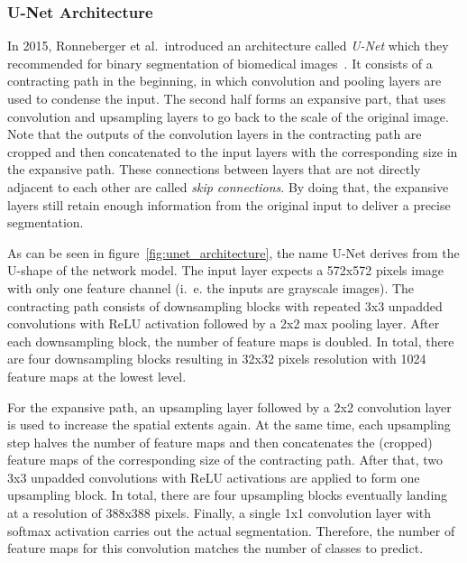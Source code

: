 \subsubsection{U-Net Architecture}
\label{sec:unet}
In 2015, Ronneberger et al.\ introduced an architecture called \emph{U-Net} which they recommended for binary segmentation of biomedical images~\cite{unet15}. It consists of a contracting path in the beginning, in which convolution and pooling layers are used to condense the input. The second half forms an expansive part, that uses convolution and upsampling layers to go back to the scale of the original image. Note that the outputs of the convolution layers in the contracting path are cropped and then concatenated to the input layers with the corresponding size in the expansive path. These connections between layers that are not directly adjacent to each other are called \emph{skip connections}. By doing that, the expansive layers still retain enough information from the original input to deliver a precise segmentation.

As can be seen in figure~\ref{fig:unet_architecture}, the name U-Net derives from the U-shape of the network model. The input layer expects a 572x572 pixels image with only one feature channel (i.~e. the inputs are grayscale images). The contracting path consists of downsampling blocks with repeated 3x3 unpadded convolutions with ReLU activation followed by a 2x2 max pooling layer. After each downsampling block, the number of feature maps is doubled. In total, there are four downsampling blocks resulting in 32x32 pixels resolution with 1024 feature maps at the lowest level.

For the expansive path, an upsampling layer followed by a 2x2 convolution layer is used to increase the spatial extents again. At the same time, each upsampling step halves the number of feature maps and then concatenates the (cropped) feature maps of the corresponding size of the contracting path. After that, two 3x3 unpadded convolutions with ReLU activations are applied to form one upsampling block. In total, there are four upsampling blocks eventually landing at a resolution of 388x388 pixels. Finally, a single 1x1 convolution layer with softmax activation carries out the actual segmentation. Therefore, the number of feature maps for this convolution matches the number of classes to predict.

